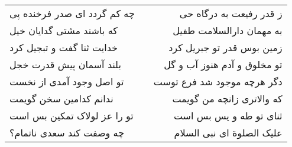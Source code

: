 \begin{center}
\begin{longtable}{l p{0.5cm} r}
\\
چه کم گردد ای صدر فرخنده پی
&&
ز قدر رفیعت به درگاه حی
\\
که باشند مشتی گدایان خیل
&&
به مهمان دارالسلامت طفیل
\\
خدایت ثنا گفت و تبجیل کرد
&&
زمین بوس قدر تو جبریل کرد
\\
بلند آسمان پیش قدرت خجل
&&
تو مخلوق و آدم هنوز آب و گل
\\
تو اصل وجود آمدی از نخست
&&
دگر هرچه موجود شد فرع توست
\\
ندانم کدامین سخن گویمت
&&
که والاتری زانچه من گویمت
\\
تو را عز لولاک تمکین بس است
&&
ثنای تو طه و یس بس است
\\
چه وصفت کند سعدی ناتمام؟
&&
علیک الصلوة ای نبی السلام
\\
\end{longtable}
\end{center}
